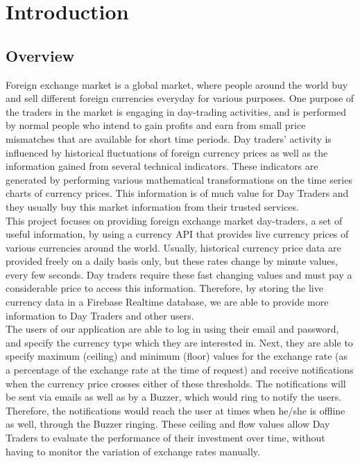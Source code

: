 \newpage
\section{Introduction}

\subsection{Overview}

Foreign exchange market is a global market, where people around the world buy and sell different foreign currencies everyday for various purposes. One purpose of the traders in the market is engaging in day-trading activities, and is performed by normal people who intend to gain profits and earn from small price mismatches that are available for short time periods. Day traders’ activity is influenced by historical fluctuations of foreign currency prices as well as the information gained from several technical indicators. These indicators are generated by performing various mathematical transformations on the time series charts of currency prices. This information is of much value for Day Traders and they usually buy this market information from their trusted services.\\

This project focuses on providing foreign exchange market day-traders, a set of useful information, by using a currency API that provides live currency prices of various currencies around the world. Usually, historical currency price data are provided freely on a daily basis only, but these rates change by minute values, every few seconds. Day traders require these fast changing values and must pay a considerable price to access this information. Therefore, by storing the live currency data in a Firebase Realtime database, we are able to provide more information to Day Traders and other users.\\

The users of our application are able to log in using their email and password, and specify the currency type which they are interested in. Next, they are able to specify maximum (ceiling) and minimum (floor) values for the exchange rate (as a percentage of the exchange rate at the time of request) and receive notifications when the currency price crosses either of these thresholds. The notifications will be sent via emails as well as by a  Buzzer, which would ring to notify the users. Therefore,  the notifications would reach the user at times when he/she is offline as well, through the Buzzer ringing. These ceiling and flow values allow Day Traders to evaluate the performance of their investment over time, without having to monitor the variation of exchange rates manually.\\

